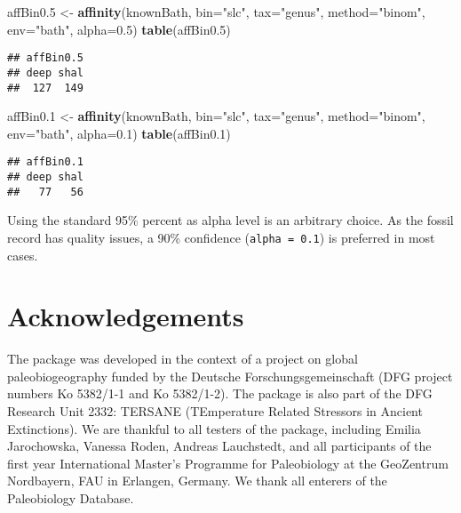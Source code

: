 \documentclass[]{article}
\newenvironment{Shaded}{\begin{snugshade}}{\end{snugshade}}
\newcommand{\DataTypeTok}[1]{\textcolor[rgb]{0.13,0.29,0.53}{#1}}
\newcommand{\FloatTok}[1]{\textcolor[rgb]{0.00,0.00,0.81}{#1}}
\newcommand{\KeywordTok}[1]{\textcolor[rgb]{0.13,0.29,0.53}{\textbf{#1}}}
\newcommand{\NormalTok}[1]{#1}
\newcommand{\StringTok}[1]{\textcolor[rgb]{0.31,0.60,0.02}{#1}}
\begin{document}
\begin{Shaded}
\begin{Highlighting}[]
\NormalTok{affBin0}\FloatTok{.5}\NormalTok{ <-}\StringTok{ }\KeywordTok{affinity}\NormalTok{(knownBath, }\DataTypeTok{bin=}\StringTok{"slc"}\NormalTok{, }\DataTypeTok{tax=}\StringTok{"genus"}\NormalTok{, }
  \DataTypeTok{method=}\StringTok{"binom"}\NormalTok{, }\DataTypeTok{env=}\StringTok{"bath"}\NormalTok{, }\DataTypeTok{alpha=}\FloatTok{0.5}\NormalTok{)}
\KeywordTok{table}\NormalTok{(affBin0}\FloatTok{.5}\NormalTok{)}
\end{Highlighting}
\end{Shaded}

\begin{verbatim}
## affBin0.5
## deep shal 
##  127  149
\end{verbatim}

\begin{Shaded}
\begin{Highlighting}[]
\NormalTok{affBin0}\FloatTok{.1}\NormalTok{ <-}\StringTok{ }\KeywordTok{affinity}\NormalTok{(knownBath, }\DataTypeTok{bin=}\StringTok{"slc"}\NormalTok{, }\DataTypeTok{tax=}\StringTok{"genus"}\NormalTok{, }
  \DataTypeTok{method=}\StringTok{"binom"}\NormalTok{, }\DataTypeTok{env=}\StringTok{"bath"}\NormalTok{, }\DataTypeTok{alpha=}\FloatTok{0.1}\NormalTok{)}
\KeywordTok{table}\NormalTok{(affBin0}\FloatTok{.1}\NormalTok{)}
\end{Highlighting}
\end{Shaded}

\begin{verbatim}
## affBin0.1
## deep shal 
##   77   56
\end{verbatim}

Using the standard 95\% percent as alpha level is an arbitrary choice.
As the fossil record has quality issues, a 90\% confidence
(\texttt{alpha\ =\ 0.1}) is preferred in most cases.

\hypertarget{acknowledgements}{%
\section{Acknowledgements}\label{acknowledgements}}

The package was developed in the context of a project on global
paleobiogeography funded by the Deutsche Forschungsgemeinschaft (DFG
project numbers Ko 5382/1-1 and Ko 5382/1-2). The package is also part
of the DFG Research Unit 2332: TERSANE (TEmperature Related Stressors in
Ancient Extinctions). We are thankful to all testers of the package,
including Emilia Jarochowska, Vanessa Roden, Andreas Lauchstedt, and all
participants of the first year International Master's Programme for
Paleobiology at the GeoZentrum Nordbayern, FAU in Erlangen, Germany. We
thank all enterers of the Paleobiology Database.
\end{document}
